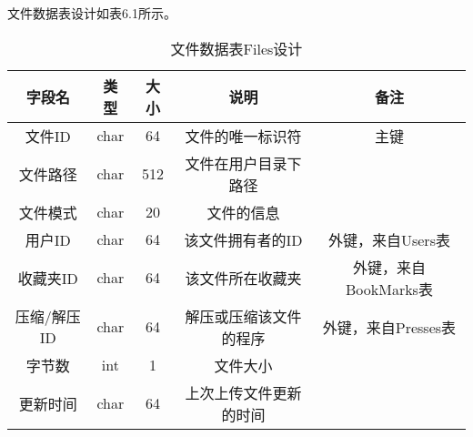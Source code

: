 文件数据表设计如表6.1所示。
\begin{table}[htbp]
\centering
\caption{文件数据表Files设计} \label{tab:files-database}
\begin{tabular}{|c|c|c|c|c|}
    \hline
    字段名 & 类型 & 大小 & 说明 & 备注 \\
    \hline
    文件ID & char & 64 & 文件的唯一标识符 & 主键\\
    \hline
    文件路径 & char & 512 & 文件在用户目录下路径 & \\
    \hline
    文件模式 & char & 20 & 文件的信息& \\
    \hline
    用户ID & char & 64 & 该文件拥有者的ID & 外键，来自Users表 \\
    \hline
    收藏夹ID & char & 64 & 该文件所在收藏夹 & 外键，来自BookMarks表 \\
    \hline
    压缩/解压ID & char & 64 & 解压或压缩该文件的程序 & 外键，来自Presses表 \\
    \hline
    字节数 & int & 1 & 文件大小 & \\
    \hline
    更新时间 & char & 64 & 上次上传文件更新的时间 & \\
    \hline
\end{tabular}
\end{table}

